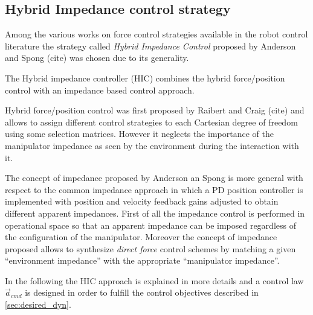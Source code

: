 \subsection{Hybrid Impedance control strategy}
Among the various works on force control strategies available in the robot control
literature the strategy called \emph{Hybrid Impedance Control} proposed by Anderson and Spong (cite)
was chosen due to its generality.
\par
The Hybrid impedance controller (HIC) combines the hybrid force/position control
with an impedance based control approach.
\par
Hybrid force/position control was first proposed by Raibert and Craig (cite) and
allows to assign different control strategies to each 
Cartesian degree of freedom using some selection matrices. However it neglects the
importance of the manipulator impedance as seen by the environment during the interaction with it.
\par
The concept of impedance proposed by Anderson an Spong is more general with respect to the common
impedance approach in which a PD position controller is implemented with position and velocity
feedback gains adjusted to obtain different apparent impedances. First of all the
impedance control is performed in operational space so that an apparent impedance can be imposed
regardless of the configuration of the manipulator. Moreover the concept of impedance proposed
allows to synthesize \emph{direct force} control schemes by matching a given ``environment impedance''
with the appropriate ``manipulator impedance''.
\par
In the following the HIC approach is explained in more details
and a control law $\vec{a}_{cmd}$ is designed in order to fulfill
the control objectives described in \ref{sec:desired_dyn}.

